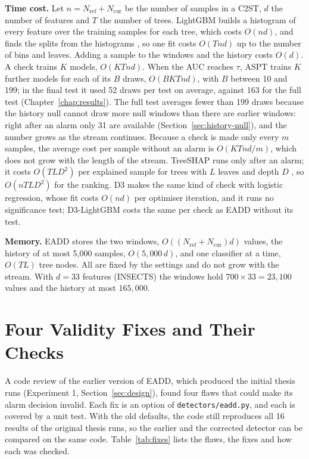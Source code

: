 \textbf{Time cost.} Let $n = N_{\mathrm{ref}} + N_{\mathrm{cur}}$ be the number of samples in a C2ST, $d$ the number of features and $T$ the number of trees. LightGBM builds a histogram of every feature over the training samples for each tree, which costs $O(nd)$, and finds the splits from the histograms \citep{Ke2017}, so one fit costs $O(Tnd)$ up to the number of bins and leaves. Adding a sample to the windows and the history costs $O(d)$. A check trains $K$ models, $O(KTnd)$. When the AUC reaches $\tau$, ASPT trains $K$ further models for each of its $B$ draws, $O(BKTnd)$, with $B$ between 10 and 199; in the final test it used 52 draws per test on average, against 163 for the full test (Chapter~\ref{chap:results}). The full test averages fewer than 199 draws because the history null cannot draw more null windows than there are earlier windows: right after an alarm only 31 are available (Section~\ref{sec:history-null}), and the number grows as the stream continues. Because a check is made only every $m$ samples, the average cost per sample without an alarm is $O(KTnd/m)$, which does not grow with the length of the stream. TreeSHAP runs only after an alarm; it costs $O(TLD^2)$ per explained sample for trees with $L$ leaves and depth $D$ \citep{LundbergInteraction2020}, so $O(nTLD^2)$ for the ranking. D3 makes the same kind of check with logistic regression, whose fit costs $O(nd)$ per optimiser iteration, and it runs no significance test; D3-LightGBM costs the same per check as EADD without its test.

\textbf{Memory.} EADD stores the two windows, $O((N_{\mathrm{ref}} + N_{\mathrm{cur}})d)$ values, the history of at most 5,000 samples, $O(5{,}000\,d)$, and one classifier at a time, $O(TL)$ tree nodes. All are fixed by the settings and do not grow with the stream. With $d = 33$ features (INSECTS) the windows hold $700 \times 33 = 23{,}100$ values and the history at most $165{,}000$.

\section{Four Validity Fixes and Their Checks}
\label{sec:fixes}
A code review of the earlier version of EADD, which produced the initial thesis runs (Experiment 1, Section~\ref{sec:design}), found four flaws that could make its alarm decision invalid. Each fix is an option of \texttt{detectors/eadd.py}, and each is covered by a unit test. With the old defaults, the code still reproduces all 16 results of the original thesis runs, so the earlier and the corrected detector can be compared on the same code. Table~\ref{tab:fixes} lists the flaws, the fixes and how each was checked.

